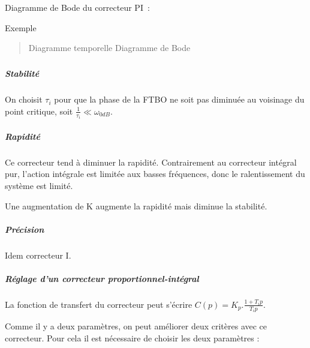 Diagramme de Bode du correcteur PI~:

Exemple

\begin{quote}
Diagramme temporelle Diagramme de Bode
\end{quote}

\hypertarget{section}{%
\subparagraph*{}\label{section}}

\hypertarget{section-1}{%
\subparagraph*{}\label{section-1}}

\hypertarget{section-2}{%
\subparagraph*{}\label{section-2}}

\hypertarget{stabilituxe9-2}{%
\subparagraph*{Stabilité}\label{stabilituxe9-2}}

On choisit \(\tau_{i}\) pour que la phase de la FTBO ne soit pas diminuée au voisinage du point critique, soit \(\frac{1}{\tau_{i}} \ll \omega_{0dB}\).

\hypertarget{rapidituxe9-2}{%
\subparagraph*{Rapidité}\label{rapidituxe9-2}}

Ce correcteur tend à diminuer la rapidité. Contrairement au correcteur intégral pur, l'action intégrale est limitée aux basses fréquences, donc le ralentissement du système est limité.

Une augmentation de K augmente la rapidité mais diminue la stabilité.

\hypertarget{pruxe9cision-2}{%
\subparagraph*{Précision}\label{pruxe9cision-2}}

Idem correcteur I.

\hypertarget{ruxe9glage-dun-correcteur-proportionnel-intuxe9gral}{%
\subparagraph*{Réglage d'un correcteur proportionnel-intégral}\label{ruxe9glage-dun-correcteur-proportionnel-intuxe9gral}}

La fonction de transfert du correcteur peut s'écrire \(C(p) = K_{p}.\frac{1 + T_{i}p}{T_{i}p}\).

Comme il y a deux paramètres, on peut améliorer deux critères avec ce correcteur. Pour cela il est nécessaire de choisir les deux paramètres :

